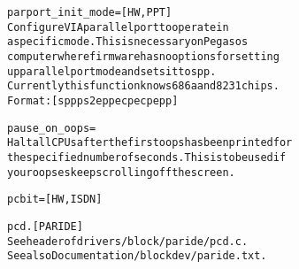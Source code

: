 \documentclass[a4paper,8pt,english]{sphinxmanual}
\begin{document}
\begin{alltt}
        parport\_init\_mode=      {[}HW,PPT{]}
                        Configure VIA parallel port to operate in
                        a specific mode. This is necessary on Pegasos
                        computer where firmware has no options for setting
                        up parallel port mode and sets it to spp.
                        Currently this function knows 686a and 8231 chips.
                        Format: {[}spp\textbar{}ps2\textbar{}epp\textbar{}ecp\textbar{}ecpepp{]}

        pause\_on\_oops=
                        Halt all CPUs after the first oops has been printed for
                        the specified number of seconds.  This is to be used if
                        your oopses keep scrolling off the screen.

        pcbit=          {[}HW,ISDN{]}

        pcd.            {[}PARIDE{]}
                        See header of drivers/block/paride/pcd.c.
                        See also Documentation/blockdev/paride.txt.


\end{alltt}
\end{document}
